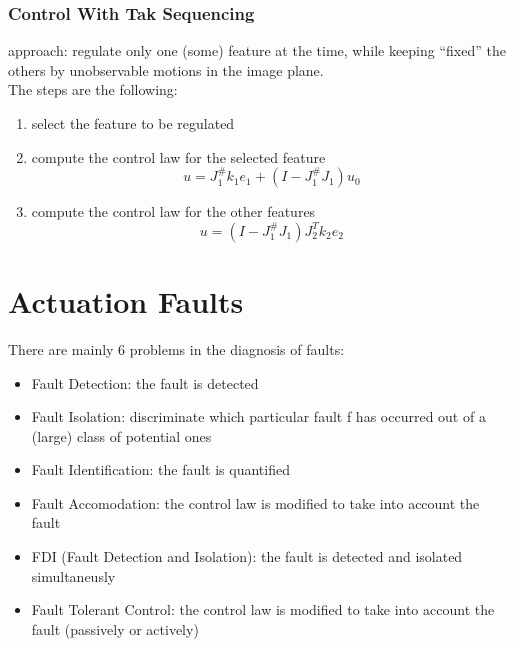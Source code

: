 \documentclass[a4paper,12pt]{article}
\begin{document}
\subsubsection{Control With Tak Sequencing}
approach: regulate only one (some) feature at the time, while keeping
“fixed” the others by unobservable motions in the image plane.\\
The steps are the following:
\begin{enumerate}
    \item select the feature to be regulated
    \item compute the control law for the selected feature \begin{equation}
    u=J^{\#}_1k_1e_1+(I-J^{\#}_1J_1)u_0
    \end{equation}
    \item compute the control law for the other features \begin{equation}
    u=(I-J^{\#}_1J_1)J^T_2k_2e_2
    \end{equation}
\end{enumerate}


\section{Actuation Faults}
There are mainly 6 problems in the diagnosis of faults: \begin{itemize}
\item Fault Detection: the fault is detected
\item Fault Isolation: discriminate which particular fault f 
has occurred out of a (large)
class of potential ones
\item Fault Identification: the fault is quantified
\item Fault Accomodation: the control law is modified to take 
into account the fault
\item FDI (Fault Detection and Isolation): the fault is detected
    and isolated simultaneusly 
\item Fault Tolerant Control: the control law is modified to
    take into account the fault (passively or actively)
\end{itemize}
\end{document}
